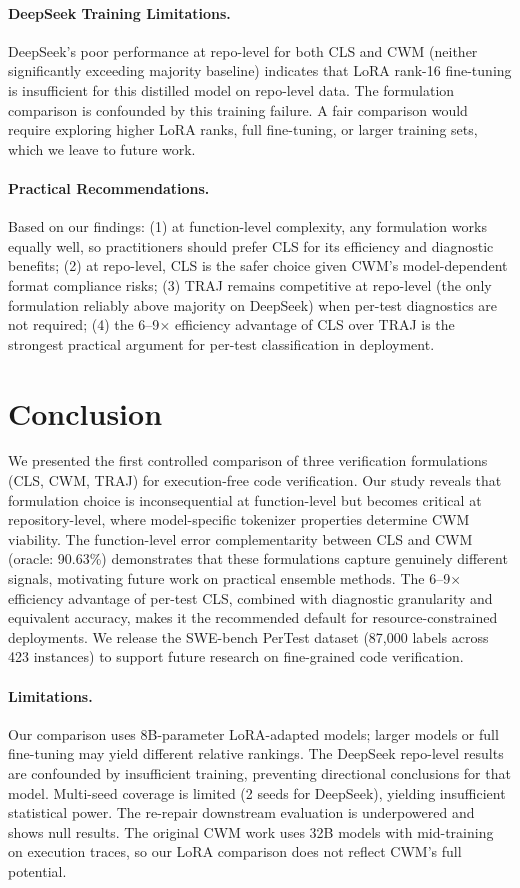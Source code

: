 \documentclass[11pt]{article}
\begin{document}
\paragraph{DeepSeek Training Limitations.}
DeepSeek's poor performance at repo-level for both CLS and CWM (neither significantly exceeding majority baseline) indicates that LoRA rank-16 fine-tuning is insufficient for this distilled model on repo-level data. The formulation comparison is confounded by this training failure. A fair comparison would require exploring higher LoRA ranks, full fine-tuning, or larger training sets, which we leave to future work.

\paragraph{Practical Recommendations.}
Based on our findings: (1) at function-level complexity, any formulation works equally well, so practitioners should prefer CLS for its efficiency and diagnostic benefits; (2) at repo-level, CLS is the safer choice given CWM's model-dependent format compliance risks; (3) TRAJ remains competitive at repo-level (the only formulation reliably above majority on DeepSeek) when per-test diagnostics are not required; (4) the 6--9$\times$ efficiency advantage of CLS over TRAJ is the strongest practical argument for per-test classification in deployment.

\section{Conclusion}

We presented the first controlled comparison of three verification formulations (CLS, CWM, TRAJ) for execution-free code verification. Our study reveals that formulation choice is inconsequential at function-level but becomes critical at repository-level, where model-specific tokenizer properties determine CWM viability. The function-level error complementarity between CLS and CWM (oracle: 90.63\%) demonstrates that these formulations capture genuinely different signals, motivating future work on practical ensemble methods. The 6--9$\times$ efficiency advantage of per-test CLS, combined with diagnostic granularity and equivalent accuracy, makes it the recommended default for resource-constrained deployments. We release the SWE-bench PerTest dataset (87,000 labels across 423 instances) to support future research on fine-grained code verification.

\paragraph{Limitations.}
Our comparison uses 8B-parameter LoRA-adapted models; larger models or full fine-tuning may yield different relative rankings. The DeepSeek repo-level results are confounded by insufficient training, preventing directional conclusions for that model. Multi-seed coverage is limited (2 seeds for DeepSeek), yielding insufficient statistical power. The re-repair downstream evaluation is underpowered and shows null results. The original CWM work uses 32B models with mid-training on execution traces, so our LoRA comparison does not reflect CWM's full potential.



\end{document}
